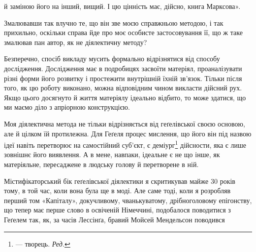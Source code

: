 й заміною його на інший, вищий. І цю цінність має, дійсно,
книга Марксова».

Змалювавши так влучно те, що він зве моєю справжньою методою,
і так прихильно, оскільки справа йде про моє особисте
застосовування її, що ж таке змалював пан автор, як не діялектичну
методу?

Безперечно, спосіб викладу мусить формально відрізнятися
від способу дослідження. Дослідження має в подробицях засвоїти
матеріял, проаналізувати різні форми його розвитку і простежити
внутрішній їхній зв’язок. Тільки після того, як цю роботу виконано,
можна відповідним чином викласти дійсний рух. Якщо
цього досягнуто й життя матеріялу ідеально відбито, то може здатися,
що ми маємо діло з апріорною конструкцією.

Моя діялектична метода не тільки відрізняється від геґелівської
своєю основою, але й цілком їй протилежна. Для Геґеля процес
мислення, що його він під назвою ідеї навіть перетворює на самостійний
суб’єкт, є деміург\footnote*{
— творець. \emph{Ред.}
} дійсности, яка є лише зовнішнє його
виявлення. А в мене, навпаки, ідеальне є не що інше, як матеріяльне,
пересаджене в людську голову й перетворене в ній.

Містифікаторський бік геґелівської діялектики я скритикував майже
30 років тому, в той час, коли вона була ще в моді. Але саме
тоді, коли я розробляв перший том «Капіталу», докучливому,
чванькуватому, дрібноголовому епігонству, що тепер має перше
слово в освіченій Німеччині, подобалося поводитися з Геґелем
так, як, за часів Лессінґа, бравий Мойсей Мендельсон поводився